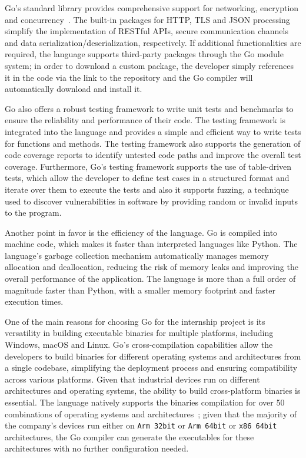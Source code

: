 
Go's standard library provides comprehensive support for networking, encryption and concurrency~\cite{go-package-std}. The built-in packages for HTTP, TLS and JSON processing simplify the implementation of RESTful APIs, secure communication channels and data serialization/deserialization, respectively. If additional functionalities are required, the language supports third-party packages through the Go module system; in order to download a custom package, the developer simply references it in the code via the link to the repository and the Go compiler will automatically download and install it.

Go also offers a robust testing framework to write unit tests and benchmarks to ensure the reliability and performance of their code. The testing framework is integrated into the language and provides a simple and efficient way to write tests for functions and methods. The testing framework also supports the generation of code coverage reports to identify untested code paths and improve the overall test coverage. Furthermore, Go's testing framework supports the use of table-driven tests, which allow the developer to define test cases in a structured format and iterate over them to execute the tests and also it supports fuzzing, a technique used to discover vulnerabilities in software by providing random or invalid inputs to the program.

Another point in favor is the efficiency of the language. Go is compiled into machine code, which makes it faster than interpreted languages like Python. The language's garbage collection mechanism automatically manages memory allocation and deallocation, reducing the risk of memory leaks and improving the overall performance of the application. The language is more than a full order of magnitude faster than Python, with a smaller memory footprint and faster execution times.~\cite{go-lang-performance}

One of the main reasons for choosing Go for the internship project is its versatility in building executable binaries for multiple platforms, including Windows, macOS and Linux. Go's cross-compilation capabilities allow the developers to build binaries for different operating systems and architectures from a single codebase, simplifying the deployment process and ensuring compatibility across various platforms. Given that industrial devices run on different architectures and operating systems, the ability to build cross-platform binaries is essential. The language natively supports the binaries compilation for over 50 combinations of operating systems and architectures~\cite{go-lang-compilation-combo}; given that the majority of the company's devices run either on \texttt{Arm 32bit} or \texttt{Arm 64bit} or \texttt{x86 64bit} architectures, the Go compiler can generate the executables for these architectures with no further configuration needed.


